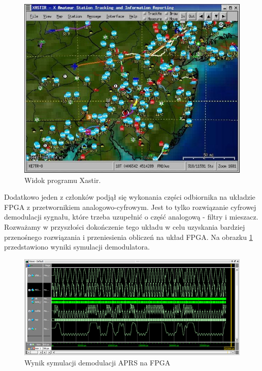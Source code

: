 \begin{figure}[!htbp]
 \includegraphics[width=\textwidth]{xastir}
 \centering
 \caption{Widok programu Xastir.}
\end{figure}


Dodatkowo jeden z członków podjął się wykonania części odbiornika na układzie FPGA z przetwornikiem analogowo-cyfrowym. Jest to tylko rozwiązanie cyfrowej demodulacji sygnału, które trzeba uzupełnić o część analogową - filtry i mieszacz. Rozważamy w przyszłości dokończenie tego układu w celu uzyskania bardziej przenośnego rozwiązania i przeniesienia obliczeń na układ FPGA. Na obrazku \ref{fpga} przedstawiono wyniki symulacji demodulatora.


\begin{figure}[!htbp]
 \includegraphics[width=\textwidth]{symulacja}
 \centering
 \caption{Wynik symulacji demodulacji APRS na FPGA}
 \label{fpga}
\end{figure}
